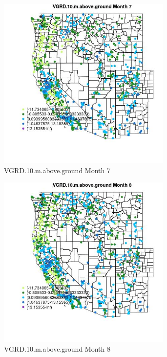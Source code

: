 \begin{figure} 
\centering  
\includegraphics[width=0.77\textwidth]{Code_Outputs/Report_ML_input_PM25_Step4_part_f_de_duplicated_aveswNAs_MapObsMo7VGRD10maboveground.jpg} 
\caption{\label{fig:Report_ML_input_PM25_Step4_part_f_de_duplicated_aveswNAsMapObsMo7VGRD10maboveground}VGRD.10.m.above.ground Month 7} 
\end{figure} 
 

\begin{figure} 
\centering  
\includegraphics[width=0.77\textwidth]{Code_Outputs/Report_ML_input_PM25_Step4_part_f_de_duplicated_aveswNAs_MapObsMo8VGRD10maboveground.jpg} 
\caption{\label{fig:Report_ML_input_PM25_Step4_part_f_de_duplicated_aveswNAsMapObsMo8VGRD10maboveground}VGRD.10.m.above.ground Month 8} 
\end{figure} 
 

